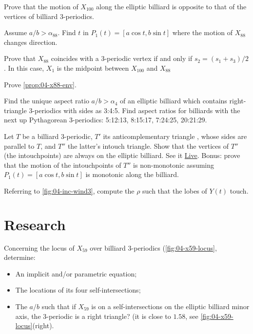 \begin{exercise}
Prove that the motion of $X_{100}$ along the elliptic billiard is opposite to that of the vertices of billiard 3-periodics.
\label{exe:04-x100}
\end{exercise}

\begin{exercise}
Assume $a/b>\alpha_{88}$. Find $t$ in $P_1(t)=[a\cos{t},b\sin{t}]$ where the motion of $X_{88}$ changes direction.
\end{exercise}

\begin{exercise}
Prove that $X_{88}$ coincides with a 3-periodic vertex if and only if $s_2 = (s_1+s_3)/2$. In this case, $X_1$ is the midpoint between $X_{100}$ and $X_{88}$ 
\end{exercise}

\begin{exercise}
Prove \cref{prop:04-x88-env}.
\end{exercise}

\begin{exercise}
Find the unique aspect ratio $a/b>\alpha_4$ of an elliptic billiard which contains right-triangle 3-periodics with sides as 3:4:5. Find aspect ratios for billiards with the next up Pythagorean 3-periodics: 5:12:13, 8:15:17, 7:24:25, 20:21:29. 
\end{exercise}

\begin{exercise}
Let $T$ be a billiard 3-periodic, $T'$ its anticomplementary triangle \cite{mw}, whose sides are parallel to $T$, and $T''$ the latter's intouch triangle. Show that the vertices of $T''$ (the intouchpoints) are always on the elliptic billiard. See it \href{https://bit.ly/3vbk7yu}{Live}. Bonus: prove that the motion of the intouchpoints of $T''$ is non-monotonic assuming $P_1(t)=[a\cos{t},b\sin{t}]$ is monotonic along the billiard. 
\end{exercise}

\begin{exercise}
\label{ex:04-wind}
Referring to \cref{fig:04-inc-wind3}, compute the $\rho$ such that the lobes of $Y(t)$ touch.
\end{exercise}

\section{Research}

\begin{question}
Concerning the locus of $X_{59}$ over billiard 3-periodics (\cref{fig:04-x59-locus}, determine:
\begin{itemize}
\item An implicit and/or parametric equation;
\item The locations of its four self-intersections;
\item The $a/b$ such that if $X_{59}$ is on a self-intersections on the elliptic billiard minor axis, the 3-periodic is a right triangle? (it is close to $1.58$, see \cref{fig:04-x59-locus}(right).
\end{itemize}
\end{question}

